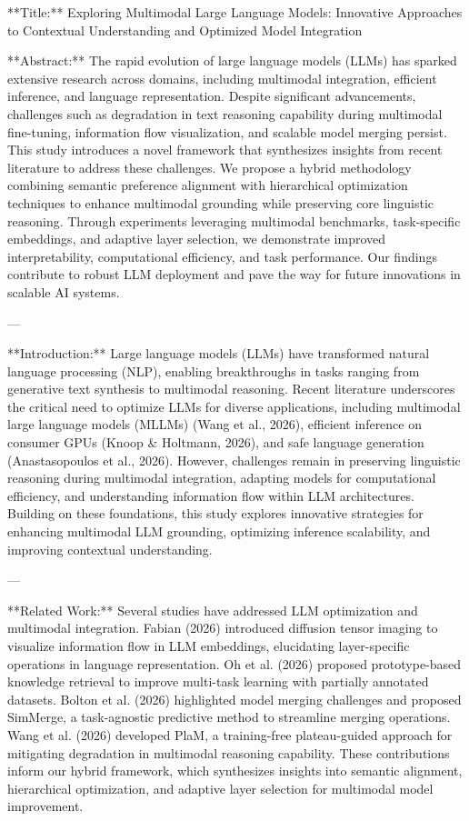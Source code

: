 **Title:**  
Exploring Multimodal Large Language Models: Innovative Approaches to Contextual Understanding and Optimized Model Integration  

**Abstract:**  
The rapid evolution of large language models (LLMs) has sparked extensive research across domains, including multimodal integration, efficient inference, and language representation. Despite significant advancements, challenges such as degradation in text reasoning capability during multimodal fine-tuning, information flow visualization, and scalable model merging persist. This study introduces a novel framework that synthesizes insights from recent literature to address these challenges. We propose a hybrid methodology combining semantic preference alignment with hierarchical optimization techniques to enhance multimodal grounding while preserving core linguistic reasoning. Through experiments leveraging multimodal benchmarks, task-specific embeddings, and adaptive layer selection, we demonstrate improved interpretability, computational efficiency, and task performance. Our findings contribute to robust LLM deployment and pave the way for future innovations in scalable AI systems.  

---

**Introduction:**  
Large language models (LLMs) have transformed natural language processing (NLP), enabling breakthroughs in tasks ranging from generative text synthesis to multimodal reasoning. Recent literature underscores the critical need to optimize LLMs for diverse applications, including multimodal large language models (MLLMs) (Wang et al., 2026), efficient inference on consumer GPUs (Knoop & Holtmann, 2026), and safe language generation (Anastasopoulos et al., 2026). However, challenges remain in preserving linguistic reasoning during multimodal integration, adapting models for computational efficiency, and understanding information flow within LLM architectures. Building on these foundations, this study explores innovative strategies for enhancing multimodal LLM grounding, optimizing inference scalability, and improving contextual understanding.  

---

**Related Work:**  
Several studies have addressed LLM optimization and multimodal integration. Fabian (2026) introduced diffusion tensor imaging to visualize information flow in LLM embeddings, elucidating layer-specific operations in language representation. Oh et al. (2026) proposed prototype-based knowledge retrieval to improve multi-task learning with partially annotated datasets. Bolton et al. (2026) highlighted model merging challenges and proposed SimMerge, a task-agnostic predictive method to streamline merging operations. Wang et al. (2026) developed PlaM, a training-free plateau-guided approach for mitigating degradation in multimodal reasoning capability. These contributions inform our hybrid framework, which synthesizes insights into semantic alignment, hierarchical optimization, and adaptive layer selection for multimodal model improvement.  

